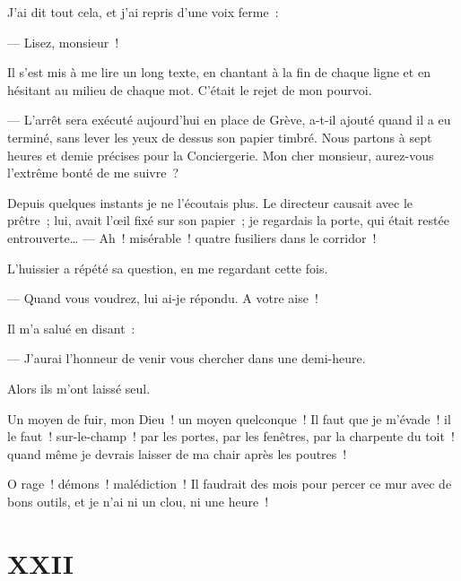 \documentclass[french,twoside]{book} %
\begin{document}
J’ai dit tout cela, et j’ai repris d’une voix ferme :\par
— Lisez, monsieur !\par
Il s’est mis à me lire un long texte, en chantant à la fin de chaque ligne et en hésitant au milieu de chaque mot. C’était le rejet de mon pourvoi.\par
— L’arrêt sera exécuté aujourd’hui en place de  Grève, a-t-il ajouté quand il a eu terminé, sans lever les yeux de dessus son papier timbré. Nous partons à sept heures et demie précises pour la Conciergerie. Mon cher monsieur, aurez-vous l’extrême bonté de me suivre ?\par
Depuis quelques instants je ne l’écoutais plus. Le directeur causait avec le prêtre ; lui, avait l’œil fixé sur son papier ; je regardais la porte, qui était restée entrouverte… — Ah ! misérable ! quatre fusiliers dans le corridor !\par
L’huissier a répété sa question, en me regardant cette fois.\par
— Quand vous voudrez, lui ai-je répondu. A votre aise !\par
Il m’a salué en disant :\par
— J’aurai l’honneur de venir vous chercher dans une demi-heure.\par
Alors ils m’ont laissé seul.\par
Un moyen de fuir, mon Dieu ! un moyen quelconque ! Il faut que je m’évade ! il le faut ! sur-le-champ ! par les portes, par les fenêtres, par la charpente du toit ! quand même je devrais laisser de ma chair après les poutres !\par
O rage ! démons ! malédiction ! Il faudrait des mois pour percer ce mur avec de bons outils, et je n’ai ni un clou, ni une heure !
 \section[{XXII}]{XXII}
\label{ch22}\renewcommand{\leftmark}{XXII}
\end{document}

